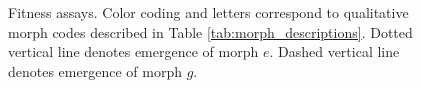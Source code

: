 \begin{figure}





\caption{ Fitness assays.
Color coding and letters correspond to qualitative morph codes described in Table \ref{tab:morph_descriptions}.
Dotted vertical line denotes emergence of morph $e$.
Dashed vertical line denotes emergence of morph $g$. }
\label{fig:fitness}

\end{figure}